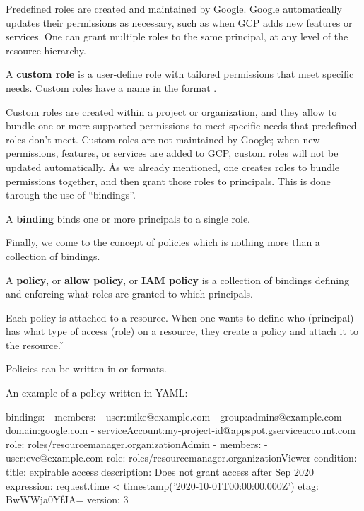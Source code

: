 Predefined roles are created and maintained by Google. Google automatically updates their permissions as necessary,
such as when GCP adds new features or services. One can grant multiple roles to the same principal, at any level
of the resource hierarchy.

A \textbf{custom role} is a user-define role with tailored permissions that meet specific needs. Custom roles have a
name in the format .
\ed

Custom roles are created within a project or organization, and they allow to bundle one or more supported permissions
to meet specific needs that predefined roles don't meet. Custom roles are not maintained by Google; when new permissions,
features, or services are added to GCP, custom roles will not be updated automatically. \v

As we already mentioned, one creates roles to bundle permissions together, and then grant those roles to principals.
This is done through the use of ``bindings''.

\bd[Binding]
A \textbf{binding} binds one or more principals to a single role.
\ed

Finally, we come to the concept of policies which is nothing more than a collection of bindings.

A \textbf{policy}, or \textbf{allow policy}, or \textbf{IAM policy} is a collection of bindings defining and enforcing
what roles are granted to which principals.
\ed

Each policy is attached to a resource. When one wants to define who (principal) has what type of access (role) on a
resource, they create a policy and attach it to the resource. \v


Policies can be written in  or  formats.

\be
An example of a policy written in YAML:
\begin{block}
bindings:
- members:
  - user:mike@example.com
  - group:admins@example.com
  - domain:google.com
  - serviceAccount:my-project-id@appspot.gserviceaccount.com
  role: roles/resourcemanager.organizationAdmin
- members:
  - user:eve@example.com
  role: roles/resourcemanager.organizationViewer
  condition:
    title: expirable access
    description: Does not grant access after Sep 2020
    expression: request.time < timestamp('2020-10-01T00:00:00.000Z')
etag: BwWWja0YfJA=
version: 3
\end{block}
\ee

